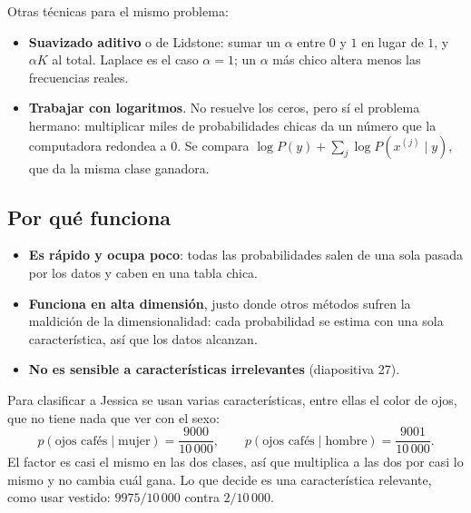 \documentclass[11pt,letterpaper]{article}
\begin{document}
Otras técnicas para el mismo problema:

\begin{itemize}[itemsep=0.3em]
    \item \textbf{Suavizado aditivo} o de Lidstone: sumar un
          $\alpha$ entre $0$ y $1$ en lugar de $1$, y $\alpha K$ al
          total. Laplace es el caso $\alpha = 1$; un $\alpha$ más chico
          altera menos las frecuencias reales.
    \item \textbf{Trabajar con logaritmos}. No resuelve los ceros, pero
          sí el problema hermano: multiplicar miles de probabilidades
          chicas da un número que la computadora redondea a $0$. Se
          compara $\log P(y) + \sum_j \log P(x^{(j)} \mid y)$, que da
          la misma clase ganadora.
\end{itemize}


\subsection*{Por qué funciona}

\begin{itemize}[itemsep=0.3em]
    \item \textbf{Es rápido y ocupa poco}: todas las probabilidades
          salen de una sola pasada por los datos y caben en una tabla
          chica.
    \item \textbf{Funciona en alta dimensión}, justo donde otros
          métodos sufren la maldición de la dimensionalidad: cada
          probabilidad se estima con una sola característica, así que
          los datos alcanzan.
    \item \textbf{No es sensible a características irrelevantes}
          (diapositiva 27).
\end{itemize}

\begin{ejemplo}
    Para clasificar a Jessica se usan varias características, entre
    ellas el color de ojos, que no tiene nada que ver con el sexo:
    \[
        p(\text{ojos cafés} \mid \text{mujer}) = \frac{9000}{10\,000},
        \qquad
        p(\text{ojos cafés} \mid \text{hombre}) = \frac{9001}{10\,000}.
    \]
    El factor es casi el mismo en las dos clases, así que multiplica a
    las dos por casi lo mismo y no cambia cuál gana. Lo que decide es
    una característica relevante, como usar vestido:
    $9975/10\,000$ contra $2/10\,000$.
\end{ejemplo}
\end{document}
